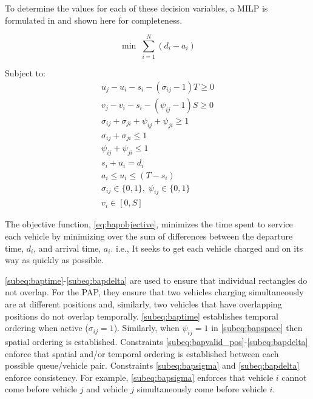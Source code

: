 \documentclass[ee,msthesis]{usuthesis}
\begin{document}
To determine the values for each of these decision variables, a MILP is formulated in \cite{qarebagh-2019-optim-sched}
and shown here for completeness.

\begin{equation}
	\label{eq:bapobjective}
	\min\; \sum_{i=1}^N (d_i - a_i)
\end{equation}

Subject to:
\begin{subequations}
\label{eq:bapconstrs}
\begin{align}
    u_j - u_i - s_i - (\sigma_{ij} - 1)T \geq 0                  \label{subeq:baptime}          \\
    v_j - v_i - s_i - (\psi_{ij} - 1)S \geq 0                \label{subeq:bapspace}           \\
    \sigma_{ij} + \sigma_{ji} + \psi_{ij} + \psi_{ji} \geq 1 \label{subeq:bapvalid_pos}     \\
    \sigma_{ij} + \sigma_{ji} \leq 1                              \label{subeq:bapsigma}        \\
    \psi_{ij} + \psi_{ji} \leq 1                              \label{subeq:bapdelta}        \\
    s_i + u_i = d_i                                               \label{subeq:bapdetach}       \\
    a_i \leq u_i \leq (T - s_i)                                   \label{subeq:bapvalid_starts} \\
    \sigma_{ij} \in \{0,1\},\;\psi_{ij} \in \{0,1\}\;           \label{subeq:bapsdspace}      \\
    v_i \in [0, S ]                                               \label{subeq:bapvspace}
\end{align}
\end{subequations}

\noindent

The objective function, \autoref{eq:bapobjective}, minimizes the time spent to service each vehicle by minimizing over
the sum of differences between the departure time, \(d_i\), and arrival time, \(a_i\). i.e., It seeks to get each vehicle
charged and on its way as quickly as possible.

\autoref{subeq:baptime}-\autoref{subeq:bapdelta} are used to ensure that individual rectangles do not overlap. For the
PAP, they ensure that two vehicles charging simultaneously are at different positions and, similarly, two vehicles that
have overlapping positions do not overlap temporally. \autoref{subeq:baptime} establishes temporal ordering when active
(\(\sigma_{ij}=1\)). Similarly, when \(\psi_{ij} =1\) in \autoref{subeq:bapspace} then spatial ordering is established. Constraints
\autoref{subeq:bapvalid_pos}-\autoref{subeq:bapdelta} enforce that spatial and/or temporal ordering is established
between each possible queue/vehicle pair. Constraints \autoref{subeq:bapsigma} and \autoref{subeq:bapdelta} enforce
consistency. For example, \autoref{subeq:bapsigma} enforces that vehicle \(i\) cannot come before vehicle \(j\) and vehicle
\(j\) simultaneously come before vehicle \(i\).
\end{document}
